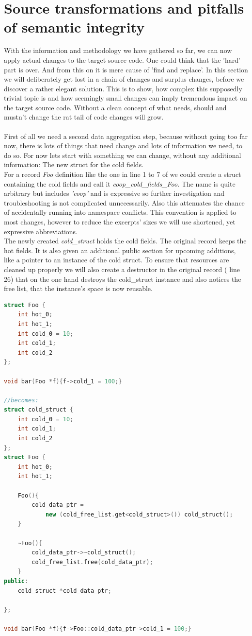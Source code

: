 \chapter{Source transformations and pitfalls of semantic integrity}
With the information and methodology we have gathered so far, we can now apply actual changes to the target source code. One could think that the 'hard' part is over. And from this on it is mere cause of 'find and replace'. In this section we will deliberately get lost in a chain of changes and surplus changes, before we discover a rather elegant solution. This is to show, how complex this supposedly trivial topic is and how seemingly small changes can imply tremendous impact on the target source code. Without a clean concept of what needs, should and mustn't change the rat tail of code changes will grow.\\\\
First of all we need a second data aggregation step, because without going too far now, there is lots of things that need change and lots of information we need, to do so. For now lets start with something we can change, without any additional information: The new struct for the cold fields.\\
For a record \textit{Foo} definition like the one in line 1 to 7 of  we could create a struct containing the cold fields and call it \textit{coop\_cold\_fields\_Foo}. The name is quite arbitrary but includes \textit{'coop'} and is expressive so further investigation and troubleshooting is not complicated unnecessarily. Also this attenuates the chance of accidentally running into namespace conflicts. This convention is applied to most changes, however to reduce the excerpts' sizes we will use shortened, yet expressive abbreviations.\\
The newly created \textit{cold\_struct} holds the cold fields. The original record keeps the hot fields. It is also given an additional public section for upcoming additions, like a pointer to an instance of the cold struct. To ensure that resources are cleaned up properly we will also create a destructor in the original record ( line 26) that on the one hand destroys the cold\_struct instance and also notices the free list, that the instance's space is now reusable.
\begin{lstlisting}[language=C++,name={Example of how a record will be split.},label={example_split_0}]
struct Foo {
	int hot_0;
	int hot_1;
	int cold_0 = 10;
	int cold_1;
	int cold_2
};

void bar(Foo *f){f->cold_1 = 100;}

//becomes:
struct cold_struct {
	int cold_0 = 10;
	int cold_1;
	int cold_2
};
struct Foo {
	int hot_0;
	int hot_1;
	
	Foo(){
		cold_data_ptr = 
			new (cold_free_list.get<cold_struct>()) cold_struct();
	}
	
	~Foo(){
		cold_data_ptr->~cold_struct();
		cold_free_list.free(cold_data_ptr);
	}
public:
	cold_struct *cold_data_ptr;

};

void bar(Foo *f){f->Foo::cold_data_ptr->cold_1 = 100;}
\end{lstlisting}
